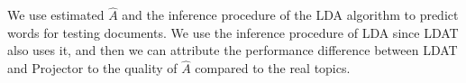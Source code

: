 We use estimated $\hat{A}$ and the inference procedure of the LDA algorithm to predict words for testing documents. We use the inference procedure of LDA since LDAT also uses it, and then we can attribute the performance difference between LDAT and Projector to the quality of $\hat{A}$ compared to the real topics.   
